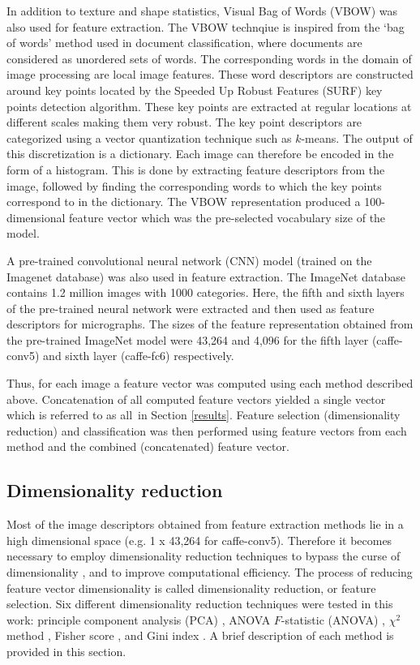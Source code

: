 In addition to texture and shape statistics, Visual Bag of Words (VBOW) \cite{Yang2007,Bay2006} was also used for feature extraction. 
The VBOW technqiue is inspired from the  `bag of words' method used in document classification, where documents are considered as unordered sets of words. The corresponding words in the domain of image processing are local image features. These word descriptors are constructed around key points located by the Speeded Up Robust Features (SURF) \cite{Bay2006} key points detection algorithm.  These key points are extracted at regular locations at different scales making them very robust. The key point descriptors are categorized using a vector quantization technique such as $k$-means. The output of this discretization is a dictionary. Each image can therefore be encoded in the form of a histogram. This is done by extracting feature descriptors from the image, followed by finding the corresponding words to which the key points correspond to in the dictionary. The VBOW representation produced a 100-dimensional feature vector which was the pre-selected vocabulary size of the model.

A pre-trained convolutional neural network (CNN) model (trained on the Imagenet database) was also used in feature extraction. The ImageNet database contains 1.2 million images with 1000 categories. Here, the fifth and sixth layers of the pre-trained neural network were extracted and then used as feature descriptors for micrographs.
The sizes of the feature representation obtained from the pre-trained ImageNet model were 43,264 and 4,096 for the fifth layer (caffe-conv5) and sixth layer (caffe-fc6) respectively.  

Thus, for each image a feature vector was computed using each method described above. Concatenation of all computed feature vectors yielded a single vector which is referred to as \textgravedbl all\textacutedbl \ in Section \ref{results}.  Feature selection (dimensionality reduction) and classification was then performed using feature vectors from each method and the combined (concatenated) feature vector.     

\subsection{Dimensionality reduction}
\label{dimensionality_reduction}

Most of the image descriptors obtained from feature extraction methods lie in a high dimensional space (e.g. 1 x 43,264 for caffe-conv5).  Therefore it becomes necessary to employ dimensionality reduction techniques to bypass the curse of dimensionality \cite{curse}, and to improve computational efficiency.  The process of reducing feature vector dimensionality is called dimensionality reduction, or feature selection. Six different dimensionality reduction techniques were tested in this work: principle component analysis (PCA) \cite{pca}, ANOVA $F$-statistic (ANOVA) \cite{anova}, ${\chi}^2$ method \cite{chi}, Fisher score \cite{fisher}, and Gini index \cite{gini}. A brief description of each method is provided in this section. 

